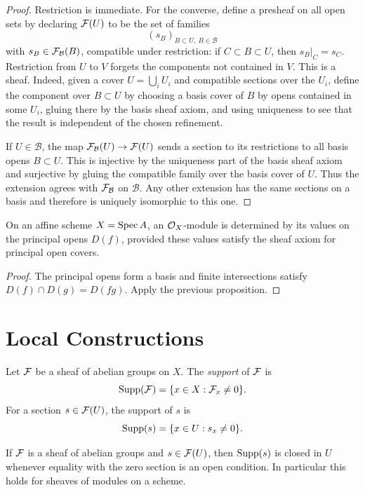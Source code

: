 \begin{proof}
Restriction is immediate.  For the converse, define a presheaf on all open
sets by declaring \(\mathcal{F}(U)\) to be the set of families
\[
    (s_B)_{B\subset U,\ B\in\mathcal B}
\]
with \(s_B\in\mathcal{F}_{\mathcal B}(B)\), compatible under restriction:
if \(C\subset B\subset U\), then \(s_B|_C=s_C\).  Restriction from \(U\) to
\(V\) forgets the components not contained in \(V\).  This is a sheaf.  Indeed,
given a cover \(U=\bigcup_i U_i\) and compatible sections over the \(U_i\),
define the component over \(B\subset U\) by choosing a basis cover of \(B\) by
opens contained in some \(U_i\), gluing there by the basis sheaf axiom, and
using uniqueness to see that the result is independent of the chosen
refinement.

If \(U\in\mathcal B\), the map \(\mathcal{F}_{\mathcal B}(U)\to\mathcal{F}(U)\) sends a section
to its restrictions to all basis opens \(B\subset U\).  This is injective by
the uniqueness part of the basis sheaf axiom and surjective by gluing the
compatible family over the basis cover of \(U\).  Thus the extension agrees
with \(\mathcal{F}_{\mathcal B}\) on \(\mathcal B\).  Any other extension has the same
sections on a basis and therefore is uniquely isomorphic to this one.
\end{proof}

\begin{corollary}
On an affine scheme \(X=\operatorname{Spec} A\), an \(\mathcal{O}_X\)-module is determined by its
values on the principal opens \(D(f)\), provided these values satisfy the
sheaf axiom for principal open covers.
\end{corollary}

\begin{proof}
The principal opens form a basis and finite intersections satisfy
\(D(f)\cap D(g)=D(fg)\).  Apply the previous proposition.
\end{proof}

\section{Local Constructions}

\begin{definition}
Let \(\mathcal{F}\) be a sheaf of abelian groups on \(X\).  The \emph{support} of
\(\mathcal{F}\) is
\[
    \operatorname{Supp}(\mathcal{F})=\{x\in X:\mathcal{F}_x\ne0\}.
\]
For a section \(s\in\mathcal{F}(U)\), the support of \(s\) is
\[
    \operatorname{Supp}(s)=\{x\in U:s_x\ne0\}.
\]
\end{definition}

\begin{proposition}
If \(\mathcal{F}\) is a sheaf of abelian groups and \(s\in\mathcal{F}(U)\), then
\(\operatorname{Supp}(s)\) is closed in \(U\) whenever equality with the zero section is an
open condition.  In particular this holds for sheaves of modules on a scheme.
\end{proposition}

